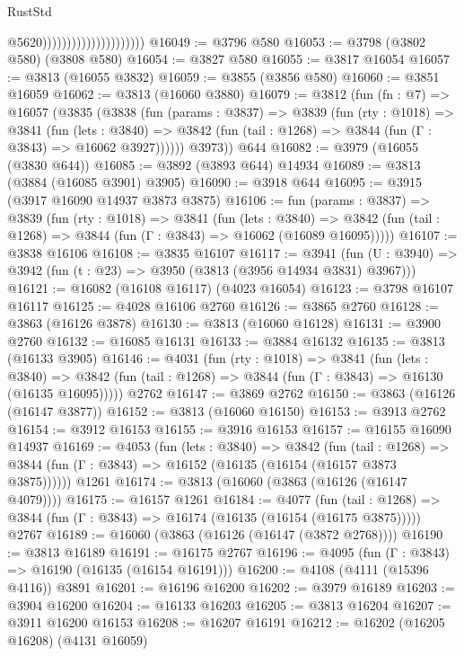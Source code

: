 \begin{lexlean}{RustStd}
\begin{coremodule}
                                              @5620)))))))))))))))))))))
@16049 := @3796 @580
@16053 := @3798 (@3802 @580) (@3808 @580)
@16054 := @3827 @580
@16055 := @3817 @16054
@16057 := @3813 (@16055 @3832)
@16059 := @3855 (@3856 @580)
@16060 := @3851 @16059
@16062 := @3813 (@16060 @3880)
@16079 := @3812
    (fun (fn : @7) =>
    @16057
      (@3835
        (@3838
          (fun (params : @3837) =>
          @3839
            (fun (rty : @1018) =>
            @3841
              (fun (lets : @3840) =>
              @3842 (fun (tail : @1268) => @3844 (fun (Γ : @3843) => @16062 @3927))))))
        @3973))
    @644
@16082 := @3979 (@16055 (@3830 @644))
@16085 := @3892 (@3893 @644) @14934
@16089 := @3813 (@3884 (@16085 @3901) @3905)
@16090 := @3918 @644
@16095 := @3915 (@3917 @16090 @14937 @3873 @3875)
@16106 := fun (params : @3837) =>
  @3839
    (fun (rty : @1018) =>
    @3841
      (fun (lets : @3840) =>
      @3842 (fun (tail : @1268) => @3844 (fun (Γ : @3843) => @16062 (@16089 @16095)))))
@16107 := @3838 @16106
@16108 := @3835 @16107
@16117 := @3941
    (fun (U : @3940) => @3942 (fun (t : @23) => @3950 (@3813 (@3956 @14934 @3831) @3967)))
@16121 := @16082 (@16108 @16117) (@4023 @16054)
@16123 := @3798 @16107 @16117
@16125 := @4028 @16106 @2760
@16126 := @3865 @2760
@16128 := @3863 (@16126 @3878)
@16130 := @3813 (@16060 @16128)
@16131 := @3900 @2760
@16132 := @16085 @16131
@16133 := @3884 @16132
@16135 := @3813 (@16133 @3905)
@16146 := @4031
    (fun (rty : @1018) =>
    @3841
      (fun (lets : @3840) =>
      @3842 (fun (tail : @1268) => @3844 (fun (Γ : @3843) => @16130 (@16135 @16095)))))
    @2762
@16147 := @3869 @2762
@16150 := @3863 (@16126 (@16147 @3877))
@16152 := @3813 (@16060 @16150)
@16153 := @3913 @2762
@16154 := @3912 @16153
@16155 := @3916 @16153
@16157 := @16155 @16090 @14937
@16169 := @4053
    (fun (lets : @3840) =>
    @3842
      (fun (tail : @1268) =>
      @3844 (fun (Γ : @3843) => @16152 (@16135 (@16154 (@16157 @3873 @3875))))))
    @1261
@16174 := @3813 (@16060 (@3863 (@16126 (@16147 @4079))))
@16175 := @16157 @1261
@16184 := @4077
    (fun (tail : @1268) => @3844 (fun (Γ : @3843) => @16174 (@16135 (@16154 (@16175 @3875)))))
    @2767
@16189 := @16060 (@3863 (@16126 (@16147 (@3872 @2768))))
@16190 := @3813 @16189
@16191 := @16175 @2767
@16196 := @4095 (fun (Γ : @3843) => @16190 (@16135 (@16154 @16191)))
@16200 := @4108 (@4111 (@15396 @4116)) @3891
@16201 := @16196 @16200
@16202 := @3979 @16189
@16203 := @3904 @16200
@16204 := @16133 @16203
@16205 := @3813 @16204
@16207 := @3911 @16200 @16153
@16208 := @16207 @16191
@16212 := @16202 (@16205 @16208) (@4131 @16059)

\end{coremodule}
\end{lexlean}
